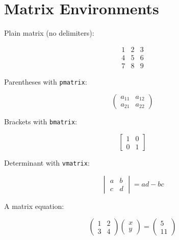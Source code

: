 \documentclass[12pt, a4paper]{article}
\begin{document}
\section*{Matrix Environments}

Plain matrix (no delimiters):

\[
\begin{matrix}
  1 & 2 & 3 \\
  4 & 5 & 6 \\
  7 & 8 & 9
\end{matrix}
\]

Parentheses with \texttt{pmatrix}:

\[
\begin{pmatrix}
  a_{11} & a_{12} \\
  a_{21} & a_{22}
\end{pmatrix}
\]

Brackets with \texttt{bmatrix}:

\[
\begin{bmatrix}
  1 & 0 \\
  0 & 1
\end{bmatrix}
\]

Determinant with \texttt{vmatrix}:

\[
\begin{vmatrix}
  a & b \\
  c & d
\end{vmatrix}
= ad - bc
\]

A matrix equation:

\[
\begin{pmatrix}
  1 & 2 \\
  3 & 4
\end{pmatrix}
\begin{pmatrix}
  x \\
  y
\end{pmatrix}
=
\begin{pmatrix}
  5 \\
  11
\end{pmatrix}
\]
\end{document}
